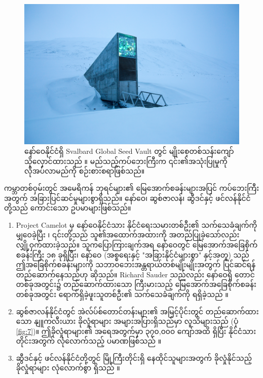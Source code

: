 \documentclass[10pt,twocolumn,letterpaper]{article}
\begin{document}
\begin{figure}[t]
\begin{center}
   \includegraphics[width=1\linewidth]{svalbard.jpg}
\end{center}
   \caption{နော်ဝေနိုင်ငံရှိ Svalbard Global Seed Vault တွင် မျိုးစေ့တစ်သန်းကျော်သိုလှောင်ထားသည် \cite{24}။ မည်သည့်ကပ်ဘေးကြီးက ၎င်း၏အသုံးပြုမှုကို လိုအပ်လာမည်ကို စဉ်းစားစရာဖြစ်သည်။}
\label{fig:8}
\label{fig:onecol}
\end{figure}

ကမ္ဘာတစ်ဝှမ်းတွင် အမေရိကန် ဘုရင်များ၏ မြေအောက်စခန်းများအပြင် ကပ်ဘေးကြီးအတွက် အခြားပြင်ဆင်မှုများစွာရှိသည်။ နော်ဝေ၊ ဆွစ်ဇာလန်၊ ဆွီဒင်နှင့် ဖင်လန်နိုင်ငံတို့သည် ကောင်းသော ဥပမာများဖြစ်သည်။

\begin{flushleft}
\begin{enumerate}
    \item Project Camelot မှ နော်ဝေနိုင်ငံသား နိုင်ငံရေးသမားတစ်ဦး၏ သက်သေခံချက်ကို မျှဝေခဲ့ပြီး \cite{25,26}၊ ၎င်းတို့သည် သူ၏အထောက်အထားကို အတည်ပြုခဲ့သော်လည်း လျှို့ဝှက်ထားခဲ့သည်။ သူကပြောကြားချက်အရ နော်ဝေတွင် မြေအောက်အခြေစိုက်စခန်းကြီး ၁၈ ခုရှိပြီး၊ နော်ဝေ (အစ္စရေးနှင့် "အခြားနိုင်ငံများစွာ" နှင့်အတူ) သည် ဤအခြေစိုက်စခန်းများကို သဘာဝဘေးအန္တရာယ်တစ်မျိုးမျိုးအတွက် ပြင်ဆင်ရန် တည်ဆောက်နေသည်ဟု ဆိုသည်။ Richard Sauder သည်လည်း နော်ဝေရှိ တောင်တစ်ခုအတွင်း၌ တည်ဆောက်ထားသော ကြီးမားသည့် မြေအောက်အခြေစိုက်စခန်းတစ်ခုအတွင်း ရောက်ရှိခဲ့ဖူးသူတစ်ဦး၏ သက်သေခံချက်ကို ရရှိခဲ့သည် \cite{22}။
    \item ဆွစ်ဇာလန်နိုင်ငံတွင် အဲလ်ပ်စ်တောင်တန်းများ၏ အမြင့်ပိုင်းတွင် တည်ဆောက်ထားသော နျူကလီးယား ခိုလှုံရာများ အများအပြားရှိသည်မှာ လူသိများသည် (ပုံ \ref{fig:7})။ ဤခိုလှုံရာများ၏ အရေအတွက်မှာ ၃၇၀,၀၀၀ ကျော်အထိ ရှိပြီး နိုင်ငံသားတိုင်းအတွက် လုံလောက်သည့် ပမာဏဖြစ်သည် \cite{27}။
    \item ဆွီဒင်နှင့် ဖင်လန်နိုင်ငံတို့တွင် မြို့ကြီးတိုင်းရှိ နေထိုင်သူများအတွက် ခိုလှုံနိုင်သည့် ခိုလှုံရာများ လုံလောက်စွာ ရှိသည် \cite{27}။
\end{enumerate}
\end{flushleft}
\end{document}
